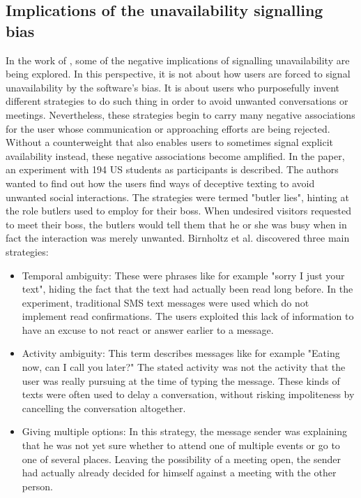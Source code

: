 \documentclass{CML_Seminar_Template}
\begin{document}
\subsection{Implications of the unavailability signalling bias}
In the work of \cite[]{Birnholtz2010}, some of the negative implications of signalling unavailability are being explored. In this perspective, it is not about how users are forced to signal unavailability by the software's bias. It is about users who purposefully invent different strategies to do such thing in order to avoid unwanted conversations or meetings. Nevertheless, these strategies begin to carry many negative associations for the user whose communication or approaching efforts are being rejected. Without a counterweight that also enables users to sometimes signal explicit availability instead, these negative associations become amplified.
In the paper, an experiment with 194 US students as participants is described. The authors wanted to find out how the users find ways of deceptive texting to avoid unwanted social interactions. The strategies were termed "butler lies", hinting at the role butlers used to employ for their boss. When 
undesired visitors requested to meet their boss, the butlers would tell them that he or she was busy when in fact the interaction was merely unwanted. Birnholtz et al. discovered three main strategies:
\begin{itemize}
	\item Temporal ambiguity: These were phrases like for example "sorry I just your text", hiding the fact that the text had actually been read long before. In the experiment, traditional SMS text messages were used which do not implement read confirmations. The users exploited this lack of information to have an excuse to not react or answer earlier to a message.
	\item Activity ambiguity: This term describes messages like for example "Eating now, can I call you later?" The stated activity was not the activity that the user was really pursuing at the time of typing the message. These kinds of texts were often used to delay a conversation, without risking impoliteness by cancelling the conversation altogether.
	\item Giving multiple options: In this strategy, the message sender was explaining that he was not yet sure whether to attend one of multiple events or go to one of several places. Leaving the possibility of a meeting open, the sender had actually already decided for himself against a meeting with the other person.
\end{itemize}
\end{document}
